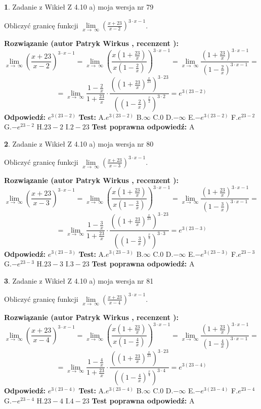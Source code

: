 \documentclass[12pt, a4paper]{article}
\theoremstyle{definition} %
\newtheorem{zad}{}
\newcommand{\zadStart}[1]{\begin{zad}#1\newline}
\newcommand{\zadStop}{\end{zad}}
\newcommand{\rozwStart}[2]{\noindent \textbf{Rozwiązanie (autor #1 , recenzent #2): }\newline}
\newcommand{\rozwStop}{\newline}
\newcommand{\odpStart}{\noindent \textbf{Odpowiedź:}\newline}
\newcommand{\odpStop}{\newline}
\newcommand{\testStart}{\noindent \textbf{Test:}\newline}
\newcommand{\testStop}{\newline}
\newcommand{\kluczStart}{\noindent \textbf{Test poprawna odpowiedź:}\newline}
\newcommand{\kluczStop}{\newline}
\begin{document}
\zadStart{Zadanie z Wikieł Z 4.10 a) moja wersja nr 79}


Obliczyć granicę funkcji  $\lim\limits_{x\to\ \infty}(\frac{x+23}{x-2})^{3\cdot x-1}$.
\zadStop
\rozwStart{Patryk Wirkus}{}
$$\lim\limits_{x\to\ \infty}(\frac{x+23}{x-2})^{3\cdot x-1} = \lim\limits_{x\to\ \infty}(\frac{x(1+\frac{23}{x})}{x(1-\frac{2}{x})})^{3\cdot x-1}=\lim\limits_{x\to\ \infty}\frac{(1+\frac{23}{x})^{3\cdot x-1}}{(1-\frac{2}{x})^{3\cdot x-1}}=$$
$$=\lim\limits_{x\to\ \infty}\frac{1-\frac{2}{x}}{1+\frac{23}{x}}\cdot\frac{((1+\frac{23}{x})^{\frac{x}{23}})^{3\cdot23}}{((1-\frac{2}{x})^{\frac{x}{2}})^{3\cdot2}}=e^{3(23-2)}$$
\rozwStop
\odpStart
$e^{3(23-2)}$
\odpStop
\testStart
A.$e^{3(23-2)}$ B.$\infty$ C.$0$ D.$-\infty$ E.$-e^{3(23-2)}$
F.$e^{23-2}$ G.$-e^{23-2}$
H.$23-2$
I.$2-23$
\testStop
\kluczStart
A
\kluczStop



\zadStart{Zadanie z Wikieł Z 4.10 a) moja wersja nr 80}


Obliczyć granicę funkcji  $\lim\limits_{x\to\ \infty}(\frac{x+23}{x-3})^{3\cdot x-1}$.
\zadStop
\rozwStart{Patryk Wirkus}{}
$$\lim\limits_{x\to\ \infty}(\frac{x+23}{x-3})^{3\cdot x-1} = \lim\limits_{x\to\ \infty}(\frac{x(1+\frac{23}{x})}{x(1-\frac{3}{x})})^{3\cdot x-1}=\lim\limits_{x\to\ \infty}\frac{(1+\frac{23}{x})^{3\cdot x-1}}{(1-\frac{3}{x})^{3\cdot x-1}}=$$
$$=\lim\limits_{x\to\ \infty}\frac{1-\frac{3}{x}}{1+\frac{23}{x}}\cdot\frac{((1+\frac{23}{x})^{\frac{x}{23}})^{3\cdot23}}{((1-\frac{3}{x})^{\frac{x}{3}})^{3\cdot3}}=e^{3(23-3)}$$
\rozwStop
\odpStart
$e^{3(23-3)}$
\odpStop
\testStart
A.$e^{3(23-3)}$ B.$\infty$ C.$0$ D.$-\infty$ E.$-e^{3(23-3)}$
F.$e^{23-3}$ G.$-e^{23-3}$
H.$23-3$
I.$3-23$
\testStop
\kluczStart
A
\kluczStop



\zadStart{Zadanie z Wikieł Z 4.10 a) moja wersja nr 81}


Obliczyć granicę funkcji  $\lim\limits_{x\to\ \infty}(\frac{x+23}{x-4})^{3\cdot x-1}$.
\zadStop
\rozwStart{Patryk Wirkus}{}
$$\lim\limits_{x\to\ \infty}(\frac{x+23}{x-4})^{3\cdot x-1} = \lim\limits_{x\to\ \infty}(\frac{x(1+\frac{23}{x})}{x(1-\frac{4}{x})})^{3\cdot x-1}=\lim\limits_{x\to\ \infty}\frac{(1+\frac{23}{x})^{3\cdot x-1}}{(1-\frac{4}{x})^{3\cdot x-1}}=$$
$$=\lim\limits_{x\to\ \infty}\frac{1-\frac{4}{x}}{1+\frac{23}{x}}\cdot\frac{((1+\frac{23}{x})^{\frac{x}{23}})^{3\cdot23}}{((1-\frac{4}{x})^{\frac{x}{4}})^{3\cdot4}}=e^{3(23-4)}$$
\rozwStop
\odpStart
$e^{3(23-4)}$
\odpStop
\testStart
A.$e^{3(23-4)}$ B.$\infty$ C.$0$ D.$-\infty$ E.$-e^{3(23-4)}$
F.$e^{23-4}$ G.$-e^{23-4}$
H.$23-4$
I.$4-23$
\testStop
\kluczStart
A
\kluczStop
\end{document}
